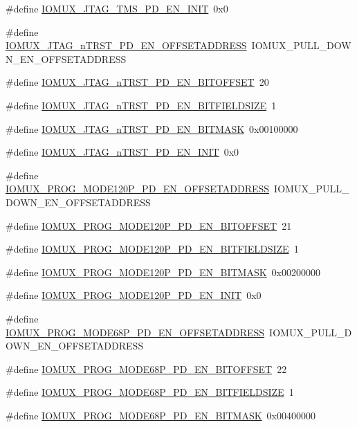 \begin{DoxyCompactItemize}
\item 
\#define \hyperlink{a00560_a8e2b1d213eba0a0ce6b6c4a56b375f5f}{IOMUX\_\-JTAG\_\-TMS\_\-PD\_\-EN\_\-INIT}~0x0
\item 
\#define \hyperlink{a00560_a85ce3e1fc768a64505858450b32861ce}{IOMUX\_\-JTAG\_\-nTRST\_\-PD\_\-EN\_\-OFFSETADDRESS}~IOMUX\_\-PULL\_\-DOWN\_\-EN\_\-OFFSETADDRESS
\item 
\#define \hyperlink{a00560_abbd8fe23f96b5c393ddbf82b4544a31c}{IOMUX\_\-JTAG\_\-nTRST\_\-PD\_\-EN\_\-BITOFFSET}~20
\item 
\#define \hyperlink{a00560_a91a6752747e8dd4df7c81aa34456a8fb}{IOMUX\_\-JTAG\_\-nTRST\_\-PD\_\-EN\_\-BITFIELDSIZE}~1
\item 
\#define \hyperlink{a00560_ac5941e0b7bf47fdadf20db0cb704d261}{IOMUX\_\-JTAG\_\-nTRST\_\-PD\_\-EN\_\-BITMASK}~0x00100000
\item 
\#define \hyperlink{a00560_a70dca75e0b08b4eaf1b97d1eb0e9df3e}{IOMUX\_\-JTAG\_\-nTRST\_\-PD\_\-EN\_\-INIT}~0x0
\item 
\#define \hyperlink{a00560_a29e6a563494efebab0c857796ebbffed}{IOMUX\_\-PROG\_\-MODE120P\_\-PD\_\-EN\_\-OFFSETADDRESS}~IOMUX\_\-PULL\_\-DOWN\_\-EN\_\-OFFSETADDRESS
\item 
\#define \hyperlink{a00560_a8a91e5b094bba052832dfcf174aaf517}{IOMUX\_\-PROG\_\-MODE120P\_\-PD\_\-EN\_\-BITOFFSET}~21
\item 
\#define \hyperlink{a00560_a1bbb6d735015354036cde91ace537780}{IOMUX\_\-PROG\_\-MODE120P\_\-PD\_\-EN\_\-BITFIELDSIZE}~1
\item 
\#define \hyperlink{a00560_a9ed58b8e6e0126f6af00d585ce700086}{IOMUX\_\-PROG\_\-MODE120P\_\-PD\_\-EN\_\-BITMASK}~0x00200000
\item 
\#define \hyperlink{a00560_a5509c7ce9615ba4eb37af789bb045139}{IOMUX\_\-PROG\_\-MODE120P\_\-PD\_\-EN\_\-INIT}~0x0
\item 
\#define \hyperlink{a00560_ad3d3272fa2c4b2d8ac8a0ecd8407acc0}{IOMUX\_\-PROG\_\-MODE68P\_\-PD\_\-EN\_\-OFFSETADDRESS}~IOMUX\_\-PULL\_\-DOWN\_\-EN\_\-OFFSETADDRESS
\item 
\#define \hyperlink{a00560_a6c9a61f8a890f1c377e1f21acb0c7db0}{IOMUX\_\-PROG\_\-MODE68P\_\-PD\_\-EN\_\-BITOFFSET}~22
\item 
\#define \hyperlink{a00560_add614e5ff980cf9bec5c17a382f4c385}{IOMUX\_\-PROG\_\-MODE68P\_\-PD\_\-EN\_\-BITFIELDSIZE}~1
\item 
\#define \hyperlink{a00560_acb14da58da566e9184e86a4b0057a5e8}{IOMUX\_\-PROG\_\-MODE68P\_\-PD\_\-EN\_\-BITMASK}~0x00400000
\item 

\end{DoxyCompactItemize}
